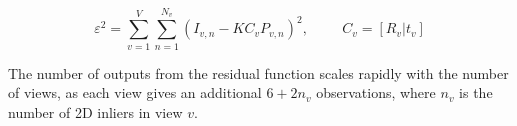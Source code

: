 \begin{equation}
\label{eq:BA}
\varepsilon^2 = \sum_{v=1}^{V}\sum_{n=1}^{N_v} (I_{v,n} - KC_vP_{v,n})^2, \hspace{1cm} C_v = [R_v | t_v]
\end{equation} 

The number of outputs from the residual function scales rapidly with the number of views, as each view gives an additional $ 6 + 2n_v $ observations, where $ n_v $ is the number of 2D inliers in view $v$.





